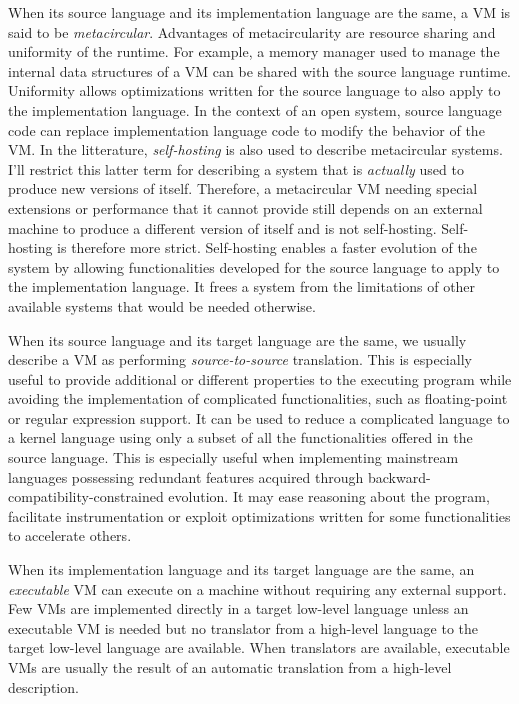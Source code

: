 When its source language and its implementation language are the same, a VM is
said to be \textit{metacircular}. Advantages of metacircularity are resource
sharing and uniformity of the runtime. For example, a memory manager used to
manage the internal data structures of a VM can be shared with the source
language runtime. Uniformity allows optimizations written for the source
language to also apply to the implementation language. In the context of an
open system, source language code can replace implementation language code to
modify the behavior of the VM. In the litterature, \textit{self-hosting} is
also used to describe metacircular systems. I'll restrict this latter term for
describing a system that is \textit{actually} used to produce new versions of
itself.  Therefore, a metacircular VM needing special extensions or
performance that it cannot provide still depends on an external machine to
produce a different version of itself and is not self-hosting. Self-hosting is
therefore more strict.  Self-hosting enables a faster evolution of the system
by allowing functionalities developed for the source language to apply to the
implementation language. It frees a system from the limitations of other
available systems that would be needed otherwise.

When its source language and its target language are the same, we usually
describe a VM as performing \textit{source-to-source} translation. This is
especially useful to provide additional or different properties to the
executing program while avoiding the implementation of complicated
functionalities, such as floating-point or regular expression support.  It can
be used to reduce a complicated language to a kernel language using only a
subset of all the functionalities offered in the source language. This is
especially useful when implementing mainstream languages possessing redundant
features acquired through backward-compatibility-constrained evolution. It may
ease reasoning about the program, facilitate instrumentation or exploit
optimizations written for some functionalities to accelerate others.

When its implementation language and its target language are the same, an
\textit{executable} VM can execute on a machine without requiring any external
support. Few VMs are implemented directly in a target low-level language unless
an executable VM is needed but no translator from a high-level language to the
target low-level language are available. When translators are available,
executable VMs are usually the result of an automatic translation from a high-level
description.

